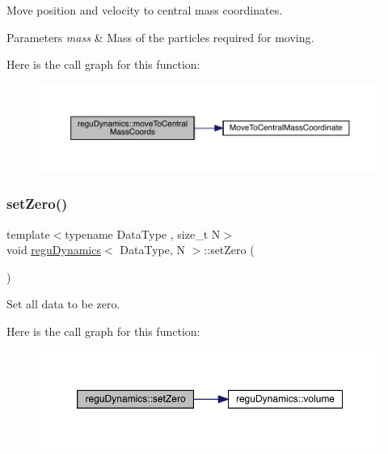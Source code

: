 Move position and velocity to central mass coordinates. 
\begin{DoxyParams}{Parameters}
{\em mass} & Mass of the particles required for moving. \\
\hline
\end{DoxyParams}
Here is the call graph for this function\+:\nopagebreak
\begin{figure}[H]
\begin{center}
\leavevmode
\includegraphics[width=350pt]{classregu_dynamics_adb57f1775922d615b8e506eaf79a1bc0_cgraph}
\end{center}
\end{figure}
\mbox{\label{classregu_dynamics_a50e6ec7efc990c325d3694e225f04194}} 
\subsubsection{\texorpdfstring{set\+Zero()}{setZero()}}
{\footnotesize\ttfamily template$<$typename Data\+Type , size\+\_\+t N$>$ \\
void \mbox{\hyperlink{classregu_dynamics}{regu\+Dynamics}}$<$ Data\+Type, N $>$\+::set\+Zero (\begin{DoxyParamCaption}{ }\end{DoxyParamCaption})\hspace{0.3cm}{\ttfamily [inline]}}



Set all data to be zero. 

Here is the call graph for this function\+:\nopagebreak
\begin{figure}[H]
\begin{center}
\leavevmode
\includegraphics[width=350pt]{classregu_dynamics_a50e6ec7efc990c325d3694e225f04194_cgraph}
\end{center}
\end{figure}
\mbox{\label{classregu_dynamics_a794ed66952b542ae63caa936e3641c4a}} 
